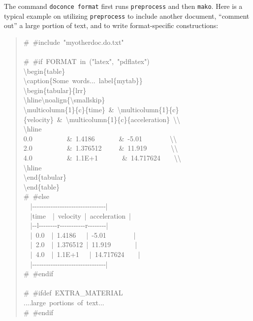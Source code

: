 \documentclass[a4paper]{article}
\begin{document}
The command \texttt{doconce format} first runs \texttt{preprocess} and then \texttt{mako}.
Here is a typical example on utilizing \texttt{preprocess} to include another
document, ``comment out'' a large portion of text, and to write format-specific
constructions:
%
\begin{quote}{\ttfamily \raggedright \noindent
\#~\#include~"myotherdoc.do.txt"\\
~\\
\#~\#if~FORMAT~in~("latex",~"pdflatex")\\
\textbackslash{}begin\{table\}\\
\textbackslash{}caption\{Some~words...~label\{mytab\}\}\\
\textbackslash{}begin\{tabular\}\{lrr\}\\
\textbackslash{}hline\textbackslash{}noalign\{\textbackslash{}smallskip\}\\
\textbackslash{}multicolumn\{1\}\{c\}\{time\}~\&~\textbackslash{}multicolumn\{1\}\{c\}\{velocity\}~\&~\textbackslash{}multicolumn\{1\}\{c\}\{acceleration\}~\textbackslash{}\textbackslash{}\\
\textbackslash{}hline\\
0.0~~~~~~~~~~\&~1.4186~~~~~~~\&~-5.01~~~~~~~~\textbackslash{}\textbackslash{}\\
2.0~~~~~~~~~~\&~1.376512~~~~~\&~11.919~~~~~~~\textbackslash{}\textbackslash{}\\
4.0~~~~~~~~~~\&~1.1E+1~~~~~~~\&~14.717624~~~~\textbackslash{}\textbackslash{}\\
\textbackslash{}hline\\
\textbackslash{}end\{tabular\}\\
\textbackslash{}end\{table\}\\
\#~\#else\\
~~|-{}-{}-{}-{}-{}-{}-{}-{}-{}-{}-{}-{}-{}-{}-{}-{}-{}-{}-{}-{}-{}-{}-{}-{}-{}-{}-{}-{}-{}-{}-{}-|\\
~~|time~~|~velocity~|~acceleration~|\\
~~|-{}-l-{}-{}-{}-{}-{}-{}-{}-r-{}-{}-{}-{}-{}-{}-{}-{}-{}-{}-r-{}-{}-{}-{}-{}-{}-{}-|\\
~~|~0.0~~|~1.4186~~~|~-5.01~~~~~~~~|\\
~~|~2.0~~|~1.376512~|~11.919~~~~~~~|\\
~~|~4.0~~|~1.1E+1~~~|~14.717624~~~~|\\
~~|-{}-{}-{}-{}-{}-{}-{}-{}-{}-{}-{}-{}-{}-{}-{}-{}-{}-{}-{}-{}-{}-{}-{}-{}-{}-{}-{}-{}-{}-{}-{}-|\\
\#~\#endif\\
~\\
\#~\#ifdef~EXTRA\_MATERIAL\\
....large~portions~of~text...\\
\#~\#endif
}
\end{quote}
\end{document}
